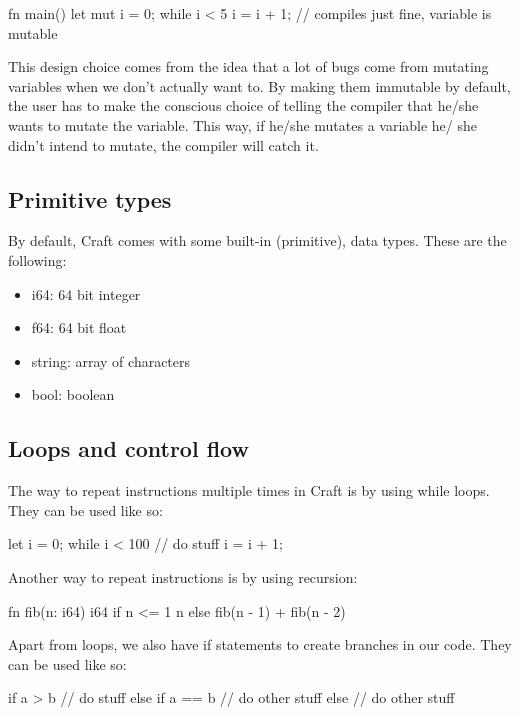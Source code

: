 ﻿\documentclass[10pt,a4paper,twocolumn,twoside]{article}
\begin{document}
\begin{code}
    fn main() {
        let mut i = 0;
        while i < 5 {
            i = i + 1; // compiles just fine, variable is mutable
        }
    }
\end{code}

This design choice comes from the idea that a lot of bugs come from 
mutating variables when we don't actually want to. By making them immutable by
default, the user has to make the conscious choice of telling the compiler that
he/she wants to mutate the variable. This way, if he/she mutates a variable he/
she didn't intend to mutate, the compiler will catch it.

\subsection{Primitive types}
By default, Craft comes with some built-in (primitive), data types. These are
the following:

\begin{itemize}
    \item i64: 64 bit integer
    \item f64: 64 bit float
    \item string: array of characters
    \item bool: boolean
\end{itemize}

\subsection{Loops and control flow}
The way to repeat instructions multiple times in Craft is by using while loops.
They can be used like so:
\begin{code}
    let i = 0;
    while i < 100 {
        // do stuff
        i = i + 1;
    }
\end{code}

Another way to repeat instructions is by using recursion:
\begin{code}
fn fib(n: i64) i64 {
    if n <= 1 {
        n
    } else {
        fib(n - 1) + fib(n - 2)
    }
}
\end{code}

Apart from loops, we also have if statements to create branches in our code. 
They can be used like so:

\begin{code}
    if a > b {
        // do stuff
    } else if a == b {
        // do other stuff
    } else {
        // do other stuff
    }
\end{code}
\end{document}

